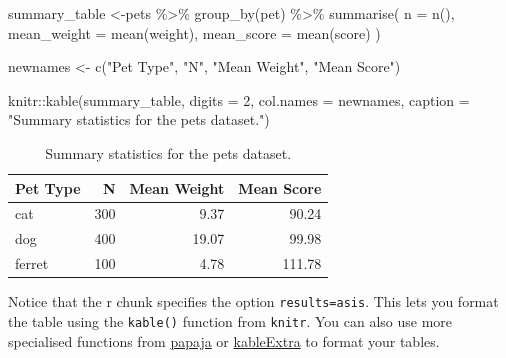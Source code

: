 \documentclass[
  oneside]{book}
\newenvironment{Shaded}{\begin{snugshade}}{\end{snugshade}}
\newcommand{\AttributeTok}[1]{\textcolor[rgb]{0.77,0.63,0.00}{#1}}
\newcommand{\DecValTok}[1]{\textcolor[rgb]{0.00,0.00,0.81}{#1}}
\newcommand{\FunctionTok}[1]{\textcolor[rgb]{0.00,0.00,0.00}{#1}}
\newcommand{\NormalTok}[1]{#1}
\newcommand{\OtherTok}[1]{\textcolor[rgb]{0.56,0.35,0.01}{#1}}
\newcommand{\SpecialCharTok}[1]{\textcolor[rgb]{0.00,0.00,0.00}{#1}}
\newcommand{\StringTok}[1]{\textcolor[rgb]{0.31,0.60,0.02}{#1}}
\begin{document}
\begin{Shaded}
\begin{Highlighting}[]
\NormalTok{summary\_table }\OtherTok{\textless{}{-}}\NormalTok{pets }\SpecialCharTok{\%\textgreater{}\%}
  \FunctionTok{group\_by}\NormalTok{(pet) }\SpecialCharTok{\%\textgreater{}\%}
  \FunctionTok{summarise}\NormalTok{(}
    \AttributeTok{n =} \FunctionTok{n}\NormalTok{(),}
    \AttributeTok{mean\_weight =} \FunctionTok{mean}\NormalTok{(weight),}
    \AttributeTok{mean\_score =} \FunctionTok{mean}\NormalTok{(score)}
\NormalTok{  )}

\NormalTok{newnames }\OtherTok{\textless{}{-}} \FunctionTok{c}\NormalTok{(}\StringTok{"Pet Type"}\NormalTok{, }\StringTok{"N"}\NormalTok{, }\StringTok{"Mean Weight"}\NormalTok{, }\StringTok{"Mean Score"}\NormalTok{)}

\NormalTok{knitr}\SpecialCharTok{::}\FunctionTok{kable}\NormalTok{(summary\_table, }
             \AttributeTok{digits =} \DecValTok{2}\NormalTok{, }
             \AttributeTok{col.names =}\NormalTok{ newnames,}
             \AttributeTok{caption =} \StringTok{"Summary statistics for the pets dataset."}\NormalTok{)}
\end{Highlighting}
\end{Shaded}

\begin{table}

\caption{\label{tab:unnamed-chunk-5}Summary statistics for the pets dataset.}
\centering
\begin{tabular}[t]{l|r|r|r}
\hline
Pet Type & N & Mean Weight & Mean Score\\
\hline
cat & 300 & 9.37 & 90.24\\
\hline
dog & 400 & 19.07 & 99.98\\
\hline
ferret & 100 & 4.78 & 111.78\\
\hline
\end{tabular}
\end{table}

\begin{info}
Notice that the r chunk specifies the option \texttt{results=\textquotesingle{}asis\textquotesingle{}}. This lets you format the table using the \texttt{kable()} function from \texttt{knitr}. You can also use more specialised functions from \href{https://crsh.github.io/papaja_man/reporting.html\#tables}{papaja} or \href{https://haozhu233.github.io/kableExtra/awesome_table_in_html.html}{kableExtra} to format your tables.

\end{info}
\end{document}

